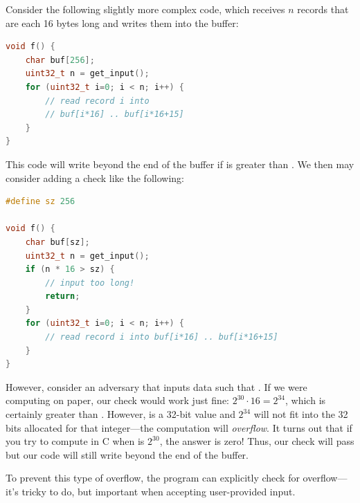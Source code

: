 Consider the following slightly more complex code, which receives $n$ records that are each 16 bytes long and writes them into the buffer:

\begin{lstlisting}[language=c]
void f() {
	char buf[256];
	uint32_t n = get_input();
	for (uint32_t i=0; i < n; i++) {
		// read record i into 
		// buf[i*16] .. buf[i*16+15]
	}
}
\end{lstlisting}

This code will write beyond the end of the buffer if  is greater than . We then may consider adding a check like the following:
\begin{lstlisting}[language=c]
#define sz 256

void f() {
	char buf[sz];
	uint32_t n = get_input();
	if (n * 16 > sz) {
		// input too long!
		return;
	}
	for (uint32_t i=0; i < n; i++) {
		// read record i into buf[i*16] .. buf[i*16+15]
	}
}
\end{lstlisting}

However, consider an adversary that inputs data such that . If we
were computing on paper, our check would work just fine: $2^{30} \cdot 16 = 2^{34}$,
which is certainly greater than . However,  is a 32-bit value
and $2^{34}$ will not fit into the 32 bits allocated for that integer---the computation
will \emph{overflow}.
It turns out that if you try to compute
 in C when  is $2^{30}$, the answer is zero! Thus, our check
will pass but our code will still write beyond the end of the buffer. 

To prevent this type of overflow, the program can explicitly check
for overflow---it's tricky to do, but important when accepting user-provided input.

